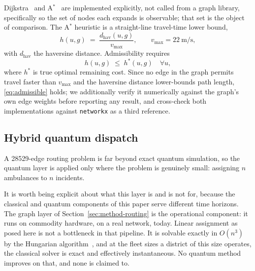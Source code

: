 \documentclass[11pt,a4paper]{article}
\begin{document}
Dijkstra~\citep{dijkstra1959} and A$^\ast$~\citep{hart1968} are implemented
explicitly, not called from a graph library, specifically so the set of
nodes each expands is observable; that set is the object of comparison. The
A$^\ast$ heuristic is a straight-line travel-time lower bound,
\begin{equation}
h(u,g) \;=\; \frac{d_{\mathrm{hav}}(u,g)}{v_{\max}},
\qquad v_{\max}=\SI{22}{\metre\per\second},
\label{eq:heuristic}
\end{equation}
with $d_{\mathrm{hav}}$ the haversine distance. Admissibility requires
\begin{equation}
h(u,g) \;\le\; h^{*}(u,g) \quad \forall u,
\label{eq:admissible}
\end{equation}
where $h^{*}$ is true optimal remaining cost. Since no edge in the graph permits
travel faster than $v_{\max}$ and the haversine distance lower-bounds path
length, \eqref{eq:admissible} holds; we additionally verify it numerically
against the graph's own edge weights before reporting any result, and cross-check
both implementations against \texttt{networkx} as a third reference.

\subsection{Hybrid quantum dispatch}
\label{sec:method-qaoa}
A \num{28529}-edge routing problem is far beyond exact quantum simulation, so the
quantum layer is applied only where the problem is genuinely small: assigning
$n$ ambulances to $n$ incidents.

It is worth being explicit about what this layer is and is not for, because the
classical and quantum components of this paper serve different time horizons. The
graph layer of Section~\ref{sec:method-routing} is the operational component: it
runs on commodity hardware, on a real network, today. Linear assignment as posed
here is not a bottleneck in that pipeline. It is solvable exactly in $O(n^3)$ by
the Hungarian algorithm~\citep{kuhn1955}, and at the fleet sizes a district of
this size operates, the classical solver is exact and effectively instantaneous.
No quantum method improves on that, and none is claimed to.
\end{document}
